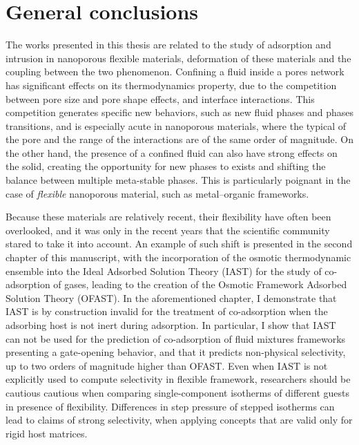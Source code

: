 
\chapter*{General conclusions}

The works presented in this thesis are related to the study of adsorption and
intrusion in nanoporous flexible materials, deformation of these materials and
the coupling between the two phenomenon. Confining a fluid inside a pores
network has significant effects on its thermodynamics property, due to the
competition between pore size and pore shape effects, and interface
interactions. This competition generates specific new behaviors, such as new
fluid phases and phases transitions, and is especially acute in nanoporous
materials, where the typical of the pore and the range of the interactions are
of the same order of magnitude. On the other hand, the presence of a confined
fluid can also have strong effects on the solid, creating the opportunity for
new phases to exists and shifting the balance between multiple meta-stable
phases. This is particularly poignant in the case of \emph{flexible} nanoporous
material, such as metal--organic frameworks.

Because these materials are relatively recent, their flexibility have often been
overlooked, and it was only in the recent years that the scientific community
stared to take it into account. An example of such shift is presented in the
second chapter of this manuscript, with the incorporation of the osmotic
thermodynamic ensemble into the Ideal Adsorbed Solution Theory (IAST) for the
study of co-adsorption of gases, leading to the creation of the Osmotic
Framework Adsorbed Solution Theory (OFAST). In the aforementioned chapter, I
demonstrate that IAST is by construction invalid for the treatment of
co-adsorption when the adsorbing host is not inert during adsorption. In
particular, I show that IAST can not be used for the prediction of co-adsorption
of fluid mixtures frameworks presenting a gate-opening behavior, and that it
predicts non-physical selectivity, up to two orders of magnitude higher than
OFAST. Even when IAST is not explicitly used to compute selectivity in flexible
framework, researchers should be cautious cautious when comparing
single-component isotherms of different guests in presence of flexibility.
Differences in step pressure of stepped isotherms can lead to claims of strong
selectivity, when applying concepts that are valid only for rigid host matrices.

